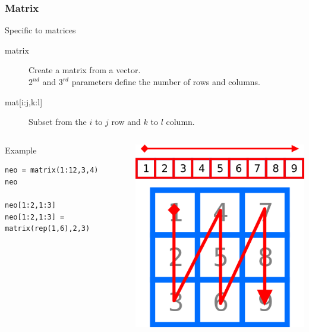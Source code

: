 \documentclass[10pt]{beamer}
\newenvironment{xframe}[2][]
  {\begin{frame}[fragile,environment=xframe,#1]
  \frametitle{#2}}
  {\end{frame}}
\begin{document}
\begin{xframe}{Matrix}
  \begin{block}{Specific to matrices}
    \begin{description}
    \item[matrix] Create a {\sf matrix} from a {\sf vector}. \\$2^{nd}$ and $3^{rd}$ parameters define the number of rows and columns.
    \item[{mat[i:j,k:l]} ] Subset from the $i$ to $j$ row and $k$ to $l$ column.
    \end{description}    
  \end{block}
  \begin{columns}
    \begin{column}{.7\textwidth}
  \begin{exampleblock}{Example}
\begin{verbatim}
neo = matrix(1:12,3,4)
neo

neo[1:2,1:3]
neo[1:2,1:3] = matrix(rep(1,6),2,3)
\end{verbatim}
  \end{exampleblock}
    \end{column}
    \begin{column}{.3\textwidth}
      \includegraphics[width=\linewidth]{imgs/matrixFillUpScheme.png}
    \end{column}
  \end{columns}
\end{xframe}
\end{document}
